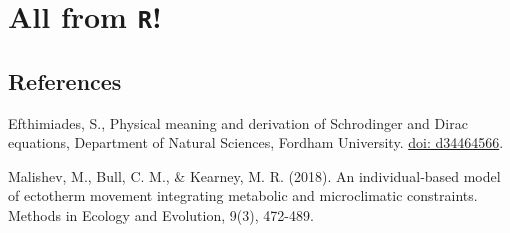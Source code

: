 \documentclass[10,portrait]{article}
\begin{document}
\section{\texorpdfstring{All from
\texttt{R}!}{All from R!}}\label{all-from-r}

\newpage  

\subsection{References}\label{references}

Efthimiades, S., Physical meaning and derivation of Schrodinger and
Dirac equations, Department of Natural Sciences, Fordham University.
\href{https://arxiv.org/vc/quant-ph/papers/0607/0607001v1.pdf}{doi:
d34464566}.

Malishev, M., Bull, C. M., \& Kearney, M. R. (2018). An individual‐based
model of ectotherm movement integrating metabolic and microclimatic
constraints. Methods in Ecology and Evolution, 9(3), 472-489.

\printbibliography
\end{document}
